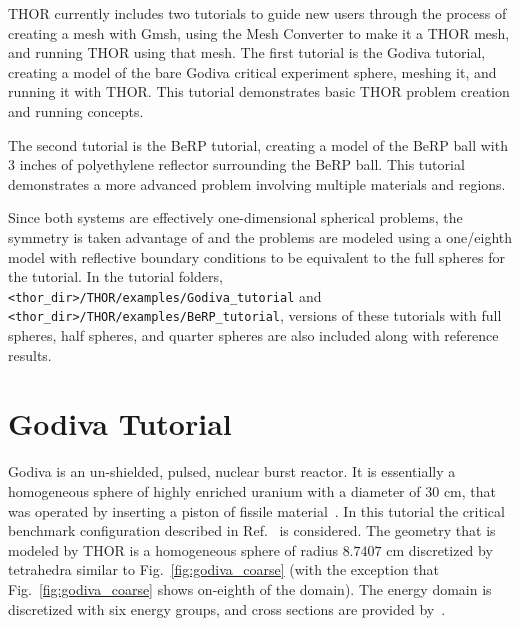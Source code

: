 THOR currently includes two tutorials to guide new users through the process of creating a mesh with Gmsh, using the Mesh Converter to make it a THOR mesh, and running THOR using that mesh.
The first tutorial is the Godiva tutorial, creating a model of the bare Godiva critical experiment sphere, meshing it, and running it with THOR.
This tutorial demonstrates basic THOR problem creation and running concepts.

The second tutorial is the BeRP tutorial, creating a model of the BeRP ball with 3 inches of polyethylene reflector surrounding the BeRP ball.
This tutorial demonstrates a more advanced problem involving multiple materials and regions.

Since both systems are effectively one-dimensional spherical problems, the symmetry is taken advantage of and the problems are modeled using a one/eighth model with reflective boundary conditions to be equivalent to the full spheres for the tutorial.
In the tutorial folders, \verb"<thor_dir>/THOR/examples/Godiva_tutorial" and \verb"<thor_dir>/THOR/examples/BeRP_tutorial", versions of these tutorials with full spheres, half spheres, and quarter spheres are also included along with reference results.

\section{Godiva Tutorial}

Godiva is an un-shielded, pulsed, nuclear burst reactor. It is essentially a homogeneous sphere of highly enriched uranium with a diameter of $30$ cm, that was operated by inserting a piston of fissile material~\cite{Godiva1961}.
In this tutorial the critical benchmark configuration described in Ref.~\cite{GodivaBenchmark} is considered. The geometry that is modeled by THOR is a homogeneous sphere of radius $8.7407$ cm discretized by tetrahedra similar to Fig.~\ref{fig:godiva_coarse} (with the exception that Fig.~\ref{fig:godiva_coarse} shows on-eighth of the domain).
The energy domain is discretized with six energy groups, and cross sections are provided by~\cite{GodivaBenchmark}.

